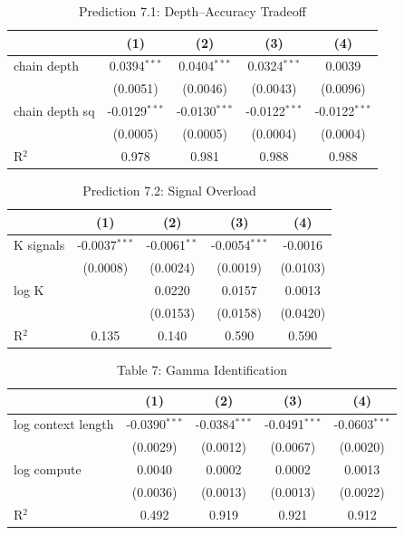 
\begin{table}[htbp]
\centering
\caption{Prediction 7.1: Depth--Accuracy Tradeoff}
\begin{tabular}{lcccc}
\toprule
 & (1) & (2) & (3) & (4) \\
\midrule
chain depth & 0.0394$^{***}$ & 0.0404$^{***}$ & 0.0324$^{***}$ & 0.0039 \\
 & (0.0051) & (0.0046) & (0.0043) & (0.0096) \\
chain depth sq & -0.0129$^{***}$ & -0.0130$^{***}$ & -0.0122$^{***}$ & -0.0122$^{***}$ \\
 & (0.0005) & (0.0005) & (0.0004) & (0.0004) \\
R$^2$ & 0.978 & 0.981 & 0.988 & 0.988 \\
\bottomrule
\end{tabular}
\end{table}

\begin{table}[htbp]
\centering
\caption{Prediction 7.2: Signal Overload}
\begin{tabular}{lcccc}
\toprule
 & (1) & (2) & (3) & (4) \\
\midrule
K signals & -0.0037$^{***}$ & -0.0061$^{**}$ & -0.0054$^{***}$ & -0.0016 \\
 & (0.0008) & (0.0024) & (0.0019) & (0.0103) \\
log K &  & 0.0220 & 0.0157 & 0.0013 \\
 &  & (0.0153) & (0.0158) & (0.0420) \\
R$^2$ & 0.135 & 0.140 & 0.590 & 0.590 \\
\bottomrule
\end{tabular}
\end{table}

\begin{table}[htbp]
\centering
\caption{Table 7: Gamma Identification}
\begin{tabular}{lcccc}
\toprule
 & (1) & (2) & (3) & (4) \\
\midrule
log context length & -0.0390$^{***}$ & -0.0384$^{***}$ & -0.0491$^{***}$ & -0.0603$^{***}$ \\
 & (0.0029) & (0.0012) & (0.0067) & (0.0020) \\
log compute & 0.0040 & 0.0002 & 0.0002 & 0.0013 \\
 & (0.0036) & (0.0013) & (0.0013) & (0.0022) \\
R$^2$ & 0.492 & 0.919 & 0.921 & 0.912 \\
\bottomrule
\end{tabular}
\end{table}
